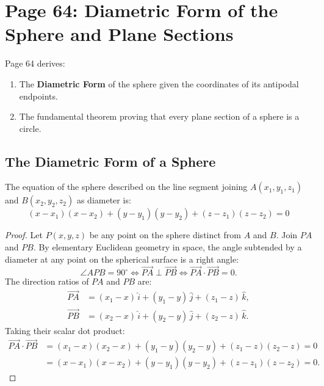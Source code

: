 \section{Page 64: Diametric Form of the Sphere and Plane Sections}
\label{sec:page64}

\begin{conceptbox}
Page 64 derives:
\begin{enumerate}[noitemsep]
    \item The \textbf{Diametric Form} of the sphere given the coordinates of its antipodal endpoints.
    \item The fundamental theorem proving that every plane section of a sphere is a circle.
\end{enumerate}
\end{conceptbox}

\subsection{The Diametric Form of a Sphere}
\begin{theorembox}
The equation of the sphere described on the line segment joining $A(x_1, y_1, z_1)$ and $B(x_2, y_2, z_2)$ as diameter is:
\begin{equation}
    \boxed{(x - x_1)(x - x_2) + (y - y_1)(y - y_2) + (z - z_1)(z - z_2) = 0}
\end{equation}
\end{theorembox}

\begin{proof}
Let $P(x, y, z)$ be any point on the sphere distinct from $A$ and $B$.
Join $PA$ and $PB$.
By elementary Euclidean geometry in space, the angle subtended by a diameter at any point on the spherical surface is a right angle:
\begin{equation}
    \angle APB = 90^\circ \iff \vec{PA} \perp \vec{PB} \iff \vec{PA} \cdot \vec{PB} = 0.
\end{equation}
The direction ratios of $PA$ and $PB$ are:
\begin{align}
    \vec{PA} &= (x_1 - x)\,\hat{i} + (y_1 - y)\,\hat{j} + (z_1 - z)\,\hat{k}, \\
    \vec{PB} &= (x_2 - x)\,\hat{i} + (y_2 - y)\,\hat{j} + (z_2 - z)\,\hat{k}.
\end{align}
Taking their scalar dot product:
\begin{align}
    \vec{PA} \cdot \vec{PB} &= (x_1 - x)(x_2 - x) + (y_1 - y)(y_2 - y) + (z_1 - z)(z_2 - z) = 0 \nonumber\\
    &= (x - x_1)(x - x_2) + (y - y_1)(y - y_2) + (z - z_1)(z - z_2) = 0.
\end{align}
\end{proof}


